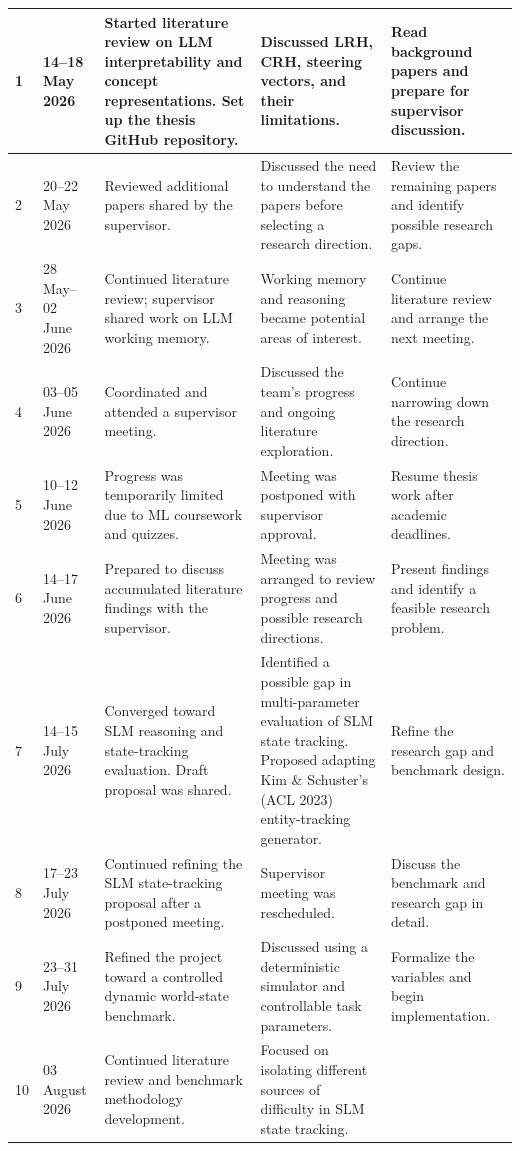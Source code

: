 \documentclass{iutbscthesis}
\begin{document}
\begin{appendices}
\begin{longtable}{@{}p{}p{}p{}p{}p{}@{}}
1 & 14--18 May 2026 &
Started literature review on LLM interpretability and concept representations. Set up the thesis GitHub
repository. &
Discussed LRH, CRH, steering vectors, and their limitations. &
Read background papers and prepare for supervisor discussion. \\
\hline
2 & 20--22 May 2026 &
Reviewed additional papers shared by the supervisor. &
Discussed the need to understand the papers before selecting a research direction. &
Review the remaining papers and identify possible research gaps. \\
\hline
3 & 28 May--02 June 2026 &
Continued literature review; supervisor shared work on LLM working memory. &
Working memory and reasoning became potential areas of interest. &
Continue literature review and arrange the next meeting. \\
\hline
4 & 03--05 June 2026 &
Coordinated and attended a supervisor meeting. &
Discussed the team's progress and ongoing literature exploration. &
Continue narrowing down the research direction. \\
\hline
5 & 10--12 June 2026 &
Progress was temporarily limited due to ML coursework and quizzes. &
Meeting was postponed with supervisor approval. &
Resume thesis work after academic deadlines. \\
\hline
6 & 14--17 June 2026 &
Prepared to discuss accumulated literature findings with the supervisor. &
Meeting was arranged to review progress and possible research directions. &
Present findings and identify a feasible research problem. \\
\hline
7 & 14--15 July 2026 &
Converged toward SLM reasoning and state-tracking evaluation. Draft proposal was shared. &
Identified a possible gap in multi-parameter evaluation of SLM state tracking. Proposed adapting Kim
\& Schuster's (ACL 2023) entity-tracking generator. &
Refine the research gap and benchmark design. \\
\hline
8 & 17--23 July 2026 &
Continued refining the SLM state-tracking proposal after a postponed meeting. &
Supervisor meeting was rescheduled. &
Discuss the benchmark and research gap in detail. \\
\hline
9 & 23--31 July 2026 &
Refined the project toward a controlled dynamic world-state benchmark. &
Discussed using a deterministic simulator and controllable task parameters. &
Formalize the variables and begin implementation. \\
\hline
10 & 03 August 2026 &
Continued literature review and benchmark methodology development. &
Focused on isolating different sources of difficulty in SLM state tracking. &

\end{longtable}
\end{appendices}
\end{document}
